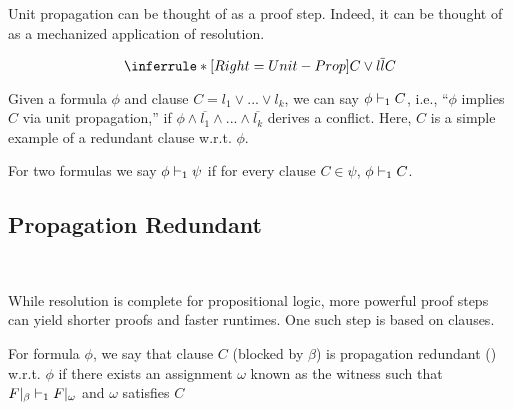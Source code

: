 Unit propagation can be thought of as a proof step. Indeed, it can be thought of as a mechanized application of resolution.

\begin{equation*}
    \inferrule*[Right=Unit-Prop]{
        C \lor l \\ \overline{l}
    }{
        C
    }
\end{equation*}

Given a formula $\phi$ and clause $C = l_1 \lor ... \lor l_k$, we can say $\phi \vdash_1 C$, i.e., ``$\phi$ implies $C$ via unit propagation,'' if $\phi \land \overline{l_1} \land ... \land \overline{l_k}$ derives a conflict. Here, $C$ is a simple example of a redundant clause w.r.t. $\phi$. 








For two formulas we say $\phi \vdash_1 \psi$ if for every clause $C \in \psi$, $\phi \vdash_1 C$. 


\subsection{Propagation Redundant}~\label{subsec:pr}

While resolution is complete for propositional logic, more powerful proof steps can yield shorter proofs and faster runtimes. One such step is based on \pr clauses.

\begin{definition}
    For formula $\phi$, we say that clause $C$ (blocked by $\beta$) is propagation redundant (\pr) w.r.t. $\phi$ if there exists an assignment $\omega$ known as the witness such that $F|_\beta \vdash_1 F|_\omega$ and $\omega$ satisfies $C$
\end{definition}

